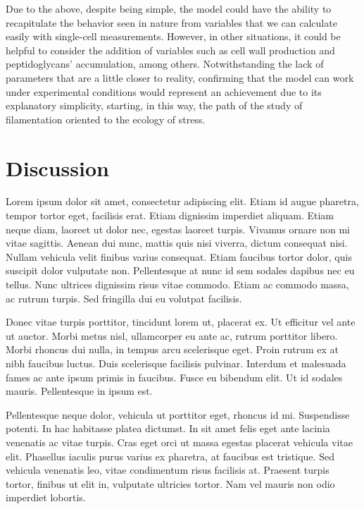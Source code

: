 \documentclass[
  12pt,
  a4paper,
  oneside]{krantz}
\begin{document}
Due to the above, despite being simple, the model could have the ability
to recapitulate the behavior seen in nature from variables that we can
calculate easily with single-cell measurements. However, in other
situations, it could be helpful to consider the addition of variables
such as cell wall production and peptidoglycans' accumulation, among
others. Notwithstanding the lack of parameters that are a little closer
to reality, confirming that the model can work under experimental
conditions would represent an achievement due to its explanatory
simplicity, starting, in this way, the path of the study of
filamentation oriented to the ecology of stress.

\hypertarget{general-discussion}{%
\chapter{Discussion}\label{general-discussion}}

Lorem ipsum dolor sit amet, consectetur adipiscing elit. Etiam id augue
pharetra, tempor tortor eget, facilisis erat. Etiam dignissim imperdiet
aliquam. Etiam neque diam, laoreet ut dolor nec, egestas laoreet turpis.
Vivamus ornare non mi vitae sagittis. Aenean dui nunc, mattis quis nisi
viverra, dictum consequat nisi. Nullam vehicula velit finibus varius
consequat. Etiam faucibus tortor dolor, quis suscipit dolor vulputate
non. Pellentesque at nunc id sem sodales dapibus nec eu tellus. Nunc
ultrices dignissim risus vitae commodo. Etiam ac commodo massa, ac
rutrum turpis. Sed fringilla dui eu volutpat facilisis.

Donec vitae turpis porttitor, tincidunt lorem ut, placerat ex. Ut
efficitur vel ante ut auctor. Morbi metus nisl, ullamcorper eu ante ac,
rutrum porttitor libero. Morbi rhoncus dui nulla, in tempus arcu
scelerisque eget. Proin rutrum ex at nibh faucibus luctus. Duis
scelerisque facilisis pulvinar. Interdum et malesuada fames ac ante
ipsum primis in faucibus. Fusce eu bibendum elit. Ut id sodales mauris.
Pellentesque in ipsum est.

Pellentesque neque dolor, vehicula ut porttitor eget, rhoncus id mi.
Suspendisse potenti. In hac habitasse platea dictumst. In sit amet felis
eget ante lacinia venenatis ac vitae turpis. Cras eget orci ut massa
egestas placerat vehicula vitae elit. Phasellus iaculis purus varius ex
pharetra, at faucibus est tristique. Sed vehicula venenatis leo, vitae
condimentum risus facilisis at. Praesent turpis tortor, finibus ut elit
in, vulputate ultricies tortor. Nam vel mauris non odio imperdiet
lobortis.
\end{document}
